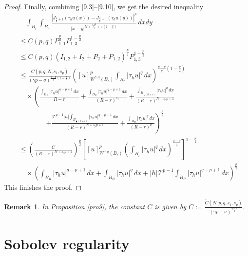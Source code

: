 \documentclass[reqno,10pt]{amsart}
\numberwithin{equation}{section}
\newtheorem{remark}[theorem]{Remark}
\begin{document}
\begin{proof}
	Finally, combining \eqref{9.3}--\eqref{9.10}, we get the desired inequality
	\begin{align*}
		&\quad\int_{B_r}\int_{B_r}\frac{\left| J_{\frac{q}{p}+1}\left( \tau_hu(x)\right)-J_{\frac{q}{p}+1}\left( \tau_hu(y)\right) \right|^p }{|x-y|^{N+\frac{s_pp^2}{2}+\sigma\left( 1-\frac{p}{2}\right) }}\,dxdy\\
		&\le C(p,q)P_{1,1}^{\frac{p}{2}}P_{1,3}^{1-\frac{p}{2}}\\
		&\le C(p,q)\left( I_{1,2}+I_2+P_2+P_{1,2}\right)^{\frac{p}{2}}P_{1,3}^{1-\frac{p}{2}}\\
		&\le \frac{C(p,q,N,s_1,s_p)}{(\gamma p-\sigma)^{\frac{q-p}{q}\left(1-\frac{p}{2}\right)}}\left([u]^{p}_{W^{\gamma,q}(B_r)}\int_{B_r}|\tau_hu|^q\,dx\right)^{\frac{q-p}{q}\left(1-\frac{p}{2}\right)}\\
		&\quad\times\left( \frac{\int_{B_R}|\tau_hu|^{q-p+1}\,dx}{R-r}+\frac{\int_{B_R}|\tau_hu|^{q-p+1}\,dx}{(R-r)^{s_1}}+\frac{\int_{B_{\frac{1}{2}(R+r)}}|\tau_hu|^{q}\,dx}{(R-r)^{N+s_pp+1}}\right.\\
		&\qquad\qquad\left.+\frac{\mathcal{T}^{p-1}|h|\int_{B_{\frac{1}{2}(R+r)}}|\tau_hu|^{q-p+1}\,dx}{(R-r)^{N+s_pp+1}}+\frac{\int_{B_R}|\tau_hu|^{q}\,dx}{(R-r)^p}\right)^{\frac{p}{2}}\\
		&\le \left( \frac{C}{(R-r)^{N+s_pp+1}}\right)^\frac{p}{2}\left[ [u]^p_{W^{\gamma,q}(B_r)}\left( \int_{B_r}|\tau_hu|^q\,dx\right)^\frac{q-p}{q} \right]^{1-\frac{p}{2}}\\
		&\quad\times\left(\int_{B_R}|\tau_hu|^{q-p+1}\,dx+\int_{B_R}|\tau_hu|^q\,dx+|h|\mathcal{T}^{p-1}\int_{B_R}|\tau_hu|^{q-p+1}\,dx\right) ^\frac{p}{2}.
	\end{align*}
This finishes the proof.
\end{proof}

\begin{remark}
	\label{rem10}
	In Proposition \ref{pro9}, the constant $C$ is given by $C:=\frac{\widetilde{C}(N,p,q,s_1,s_p)}{(\gamma p-\sigma)^\frac{q-p}{q}}$.
\end{remark}

\section{Sobolev regularity}
\label{sec4}
\end{document}
